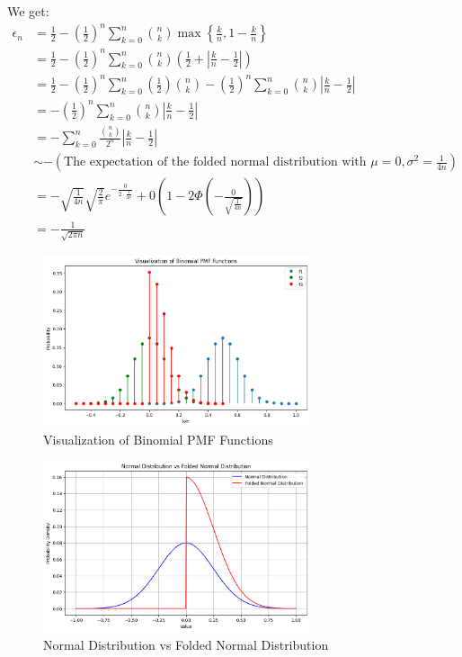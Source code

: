 \documentclass[11pt]{article}
\numberwithin{equation}{section}
\theoremstyle{boldStyle}
\begin{document}
We get:
\begin{align*}
    \epsilon_n &=  \frac{1}{2} - \left(\frac{1}{2}\right)^n \sum_{k=0}^n \binom{n}{k} \max \left\{ \frac{k}{n}, 1 - \frac{k}{n} \right\} \\
    &= \frac{1}{2} - \left(\frac{1}{2}\right)^n \sum_{k=0}^n \binom{n}{k} \left( \frac{1}{2} + \left| \frac{k}{n} - \frac{1}{2} \right| \right) \\
    &= \frac{1}{2} - \left(\frac{1}{2}\right)^n \sum_{k=0}^n \left(\frac{1}{2}\right) \binom{n}{k}  - \left(\frac{1}{2}\right)^n \sum_{k=0}^n \binom{n}{k} \left| \frac{k}{n} - \frac{1}{2} \right| \\
    &= - \left(\frac{1}{2}\right)^n \sum_{k=0}^n \binom{n}{k} \left| \frac{k}{n} - \frac{1}{2} \right| \\
    &= - \sum_{k=0}^n  \frac{\binom{n}{k}}{2^n} \left| \frac{k}{n} - \frac{1}{2} \right| \\
    &\sim - \left( \text{The expectation of the folded normal distribution with } \mu = 0, \sigma^2 = \frac{1}{4n} \right) \\
    &= - \sqrt{\frac{1}{4n}} \sqrt{\frac{2}{\pi}} e^{-\frac{0}{2 \cdot \frac{1}{4n}}} + 0 \left(1 - 2 \Phi\left(-\frac{0}{\sqrt{\frac{1}{4n}}}\right)\right) \\
    &= - \frac{1}{\sqrt{2\pi n}}
\end{align*}

\begin{figure}[H]
    \centering
    \includegraphics[width=0.7\textwidth]{figs/Visualization_of_Binomial_PMF_Functions.png}
    \caption{Visualization of Binomial PMF Functions}
    \label{fig:binomial_pmf}
\end{figure}

\begin{figure}[H]
    \centering
    \includegraphics[width=0.7\textwidth]{figs/Normal Distribution_vs_Folded_Normal_Distribution.png}
    \caption{Normal Distribution vs Folded Normal Distribution}
    \label{fig:folded_normal_distribution}
\end{figure}
\end{document}
